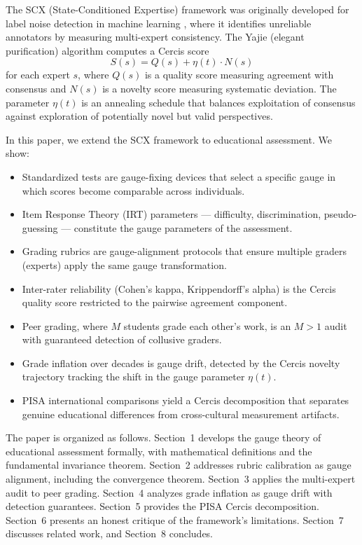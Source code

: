 \documentclass[12pt,a4paper]{article}
\theoremstyle{remark}
\begin{document}
The SCX (State-Conditioned Expertise) framework was originally developed for label noise detection in machine learning \cite{scx2026}, where it identifies unreliable annotators by measuring multi-expert consistency. The Yajie (elegant purification) algorithm computes a Cercis score
\begin{equation}
S(s) = Q(s) + \eta(t) \cdot N(s)
\label{eq:cercis}
\end{equation}
for each expert $s$, where $Q(s)$ is a quality score measuring agreement with consensus and $N(s)$ is a novelty score measuring systematic deviation. The parameter $\eta(t)$ is an annealing schedule that balances exploitation of consensus against exploration of potentially novel but valid perspectives.

In this paper, we extend the SCX framework to educational assessment. We show:

\begin{itemize}
    \item Standardized tests are gauge-fixing devices that select a specific gauge in which scores become comparable across individuals.
    \item Item Response Theory (IRT) parameters \cite{lord1968, rasch1960} --- difficulty, discrimination, pseudo-guessing --- constitute the gauge parameters of the assessment.
    \item Grading rubrics are gauge-alignment protocols that ensure multiple graders (experts) apply the same gauge transformation.
    \item Inter-rater reliability (Cohen's kappa, Krippendorff's alpha) \cite{cohen1960, krippendorff2004} is the Cercis quality score restricted to the pairwise agreement component.
    \item Peer grading, where $M$ students grade each other's work, is an $M>1$ audit with guaranteed detection of collusive graders.
    \item Grade inflation over decades is gauge drift, detected by the Cercis novelty trajectory tracking the shift in the gauge parameter $\eta(t)$.
    \item PISA international comparisons \cite{oecd2019,pisa2009} yield a Cercis decomposition that separates genuine educational differences from cross-cultural measurement artifacts.
\end{itemize}

The paper is organized as follows. Section~1 develops the gauge theory of educational assessment formally, with mathematical definitions and the fundamental invariance theorem. Section~2 addresses rubric calibration as gauge alignment, including the convergence theorem. Section~3 applies the multi-expert audit to peer grading. Section~4 analyzes grade inflation as gauge drift with detection guarantees. Section~5 provides the PISA Cercis decomposition. Section~6 presents an honest critique of the framework's limitations. Section~7 discusses related work, and Section~8 concludes.
\end{document}
